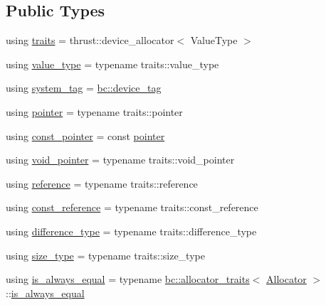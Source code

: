 \subsection*{Public Types}
\begin{DoxyCompactItemize}
\item 
using \hyperlink{structbc_1_1allocators_1_1Thrust__Allocator__Forwarder_afe95f6b4ea2efb026329137219cde467}{traits} = thrust\+::device\+\_\+allocator$<$ Value\+Type $>$
\item 
using \hyperlink{structbc_1_1allocators_1_1Thrust__Allocator__Forwarder_a6459096b2908e084eaa8a8efdc16c8ed}{value\+\_\+type} = typename traits\+::value\+\_\+type
\item 
using \hyperlink{structbc_1_1allocators_1_1Thrust__Allocator__Forwarder_a3f0fd576911b835e873f20b587a6f801}{system\+\_\+tag} = \hyperlink{structbc_1_1device__tag}{bc\+::device\+\_\+tag}
\item 
using \hyperlink{structbc_1_1allocators_1_1Thrust__Allocator__Forwarder_ad65c1d99f764c14eb0f65dc78d36e56a}{pointer} = typename traits\+::pointer
\item 
using \hyperlink{structbc_1_1allocators_1_1Thrust__Allocator__Forwarder_ae97e5b4700a6be8359c5d1fc8f82940a}{const\+\_\+pointer} = const \hyperlink{structbc_1_1allocators_1_1Thrust__Allocator__Forwarder_ad65c1d99f764c14eb0f65dc78d36e56a}{pointer}
\item 
using \hyperlink{structbc_1_1allocators_1_1Thrust__Allocator__Forwarder_a8278047ac998af0b8799ac01fc78f45d}{void\+\_\+pointer} = typename traits\+::void\+\_\+pointer
\item 
using \hyperlink{structbc_1_1allocators_1_1Thrust__Allocator__Forwarder_abc8c9530854de1017446433e27ef8ae1}{reference} = typename traits\+::reference
\item 
using \hyperlink{structbc_1_1allocators_1_1Thrust__Allocator__Forwarder_ad19d3bbcf59373c90bb8aceb3e8444ca}{const\+\_\+reference} = typename traits\+::const\+\_\+reference
\item 
using \hyperlink{structbc_1_1allocators_1_1Thrust__Allocator__Forwarder_a9e16371c961dd61923bc88863d76846f}{difference\+\_\+type} = typename traits\+::difference\+\_\+type
\item 
using \hyperlink{structbc_1_1allocators_1_1Thrust__Allocator__Forwarder_a0d59ede93a4c3e6530494375e1e6821e}{size\+\_\+type} = typename traits\+::size\+\_\+type
\item 
using \hyperlink{structbc_1_1allocators_1_1Thrust__Allocator__Forwarder_a7d6bdf9ea4c72a889c2af0a8b1deb643}{is\+\_\+always\+\_\+equal} = typename \hyperlink{structbc_1_1allocators_1_1allocator__traits}{bc\+::allocator\+\_\+traits}$<$ \hyperlink{classbc_1_1allocators_1_1Allocator}{Allocator} $>$\+::\hyperlink{structbc_1_1allocators_1_1Thrust__Allocator__Forwarder_a7d6bdf9ea4c72a889c2af0a8b1deb643}{is\+\_\+always\+\_\+equal}

\end{DoxyCompactItemize}
